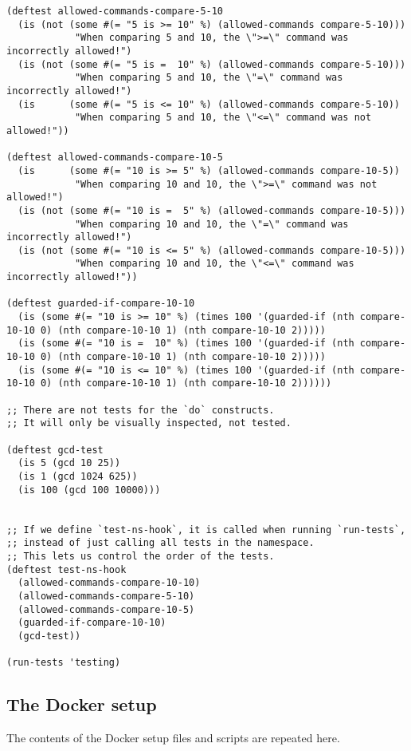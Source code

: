 \documentclass[11pt]{article}
\begin{document}
\begin{verbatim}
(deftest allowed-commands-compare-5-10
  (is (not (some #(= "5 is >= 10" %) (allowed-commands compare-5-10)))
            "When comparing 5 and 10, the \">=\" command was incorrectly allowed!")
  (is (not (some #(= "5 is =  10" %) (allowed-commands compare-5-10)))
            "When comparing 5 and 10, the \"=\" command was incorrectly allowed!")
  (is      (some #(= "5 is <= 10" %) (allowed-commands compare-5-10))
            "When comparing 5 and 10, the \"<=\" command was not allowed!"))

(deftest allowed-commands-compare-10-5
  (is      (some #(= "10 is >= 5" %) (allowed-commands compare-10-5))
            "When comparing 10 and 10, the \">=\" command was not allowed!")
  (is (not (some #(= "10 is =  5" %) (allowed-commands compare-10-5)))
            "When comparing 10 and 10, the \"=\" command was incorrectly allowed!")
  (is (not (some #(= "10 is <= 5" %) (allowed-commands compare-10-5)))
            "When comparing 10 and 10, the \"<=\" command was incorrectly allowed!"))

(deftest guarded-if-compare-10-10
  (is (some #(= "10 is >= 10" %) (times 100 '(guarded-if (nth compare-10-10 0) (nth compare-10-10 1) (nth compare-10-10 2)))))
  (is (some #(= "10 is =  10" %) (times 100 '(guarded-if (nth compare-10-10 0) (nth compare-10-10 1) (nth compare-10-10 2)))))
  (is (some #(= "10 is <= 10" %) (times 100 '(guarded-if (nth compare-10-10 0) (nth compare-10-10 1) (nth compare-10-10 2))))))

;; There are not tests for the `do` constructs.
;; It will only be visually inspected, not tested.

(deftest gcd-test
  (is 5 (gcd 10 25))
  (is 1 (gcd 1024 625))
  (is 100 (gcd 100 10000)))


;; If we define `test-ns-hook`, it is called when running `run-tests`,
;; instead of just calling all tests in the namespace.
;; This lets us control the order of the tests.
(deftest test-ns-hook
  (allowed-commands-compare-10-10)
  (allowed-commands-compare-5-10)
  (allowed-commands-compare-10-5)
  (guarded-if-compare-10-10)
  (gcd-test))

(run-tests 'testing)
\end{verbatim}

\subsection*{The Docker setup}
\label{sec:org7fbfb4b}
The contents of the Docker setup files and scripts are repeated here.
\end{document}
